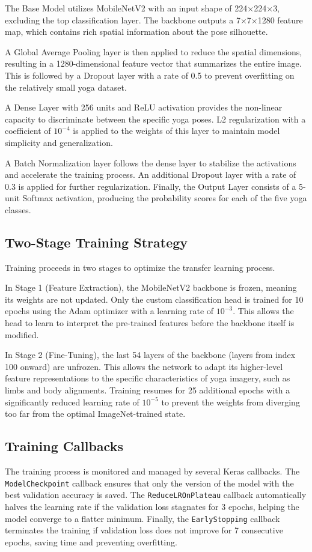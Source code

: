 The Base Model utilizes MobileNetV2 with an input shape of 224$\times$224$\times$3, excluding the top classification layer. The backbone outputs a 7$\times$7$\times$1280 feature map, which contains rich spatial information about the pose silhouette.

A Global Average Pooling layer is then applied to reduce the spatial dimensions, resulting in a 1280-dimensional feature vector that summarizes the entire image. This is followed by a Dropout layer with a rate of 0.5 to prevent overfitting on the relatively small yoga dataset.

A Dense Layer with 256 units and ReLU activation provides the non-linear capacity to discriminate between the specific yoga poses. L2 regularization with a coefficient of $10^{-4}$ is applied to the weights of this layer to maintain model simplicity and generalization.

A Batch Normalization layer follows the dense layer to stabilize the activations and accelerate the training process. An additional Dropout layer with a rate of 0.3 is applied for further regularization. Finally, the Output Layer consists of a 5-unit Softmax activation, producing the probability scores for each of the five yoga classes.

\subsection{Two-Stage Training Strategy}
Training proceeds in two stages to optimize the transfer learning process.

In Stage 1 (Feature Extraction), the MobileNetV2 backbone is frozen, meaning its weights are not updated. Only the custom classification head is trained for 10 epochs using the Adam optimizer with a learning rate of $10^{-3}$. This allows the head to learn to interpret the pre-trained features before the backbone itself is modified.

In Stage 2 (Fine-Tuning), the last 54 layers of the backbone (layers from index 100 onward) are unfrozen. This allows the network to adapt its higher-level feature representations to the specific characteristics of yoga imagery, such as limbs and body alignments. Training resumes for 25 additional epochs with a significantly reduced learning rate of $10^{-5}$ to prevent the weights from diverging too far from the optimal ImageNet-trained state.

\subsection{Training Callbacks}
The training process is monitored and managed by several Keras callbacks. The \texttt{ModelCheckpoint} callback ensures that only the version of the model with the best validation accuracy is saved. The \texttt{ReduceLROnPlateau} callback automatically halves the learning rate if the validation loss stagnates for 3 epochs, helping the model converge to a flatter minimum. Finally, the \texttt{EarlyStopping} callback terminates the training if validation loss does not improve for 7 consecutive epochs, saving time and preventing overfitting.


